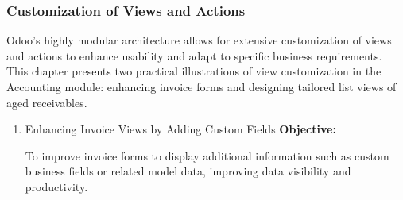 \documentclass[11pt,a4paper]{article}
\begin{document}
\subsubsection{Customization of Views and Actions}
Odoo's highly modular architecture allows for extensive 
customization of views and actions to 
enhance usability and adapt to specific business 
requirements. This chapter presents two 
practical illustrations of view customization in the 
Accounting module: enhancing invoice forms 
and designing tailored list views of aged receivables.

\begin{enumerate}
    \item Enhancing Invoice Views by Adding Custom Fields
    \textbf{Objective:} 

    To improve invoice forms to display additional information such as 
    custom business fields or related model data, improving data visibility 
    and productivity.
    \medskip


\end{enumerate}
\end{document}
